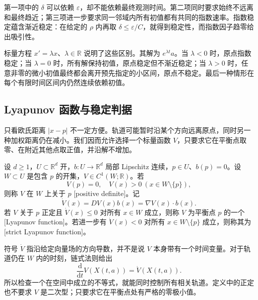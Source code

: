 第一项中的 \(\delta\) 可以依赖 \(\varepsilon\)，却不能依赖最终观测时间。第二项同时要求始终不远离和最终趋近；第三项进一步要求同一邻域内所有初值都有共同的指数速率。指数稳定蕴含渐近稳定：在给定的 \(\rho\) 内再取 \(\delta\leq\varepsilon/C\)，就得到稳定性，而指数因子趋零给出吸引性。

\ProseParagraphBreak

标量方程 \(x'=\lambda x\)、\(\lambda\in\mathbb R\) 说明了这些区别。其解为 \(e^{\lambda t}a\)。当 \(\lambda<0\) 时，原点指数稳定；当 \(\lambda=0\) 时，所有解保持初值，原点稳定但不渐近稳定；当 \(\lambda>0\) 时，任意非零的微小初值最终都会离开预先指定的小区间，原点不稳定。最后一种情形在每个有限时间区间内仍然连续依赖初值。

\subsection{Lyapunov 函数与稳定判据}
\label{b2:subsec:ode-lyapunov-stability}

只看欧氏距离 \(|x-p|\) 不一定方便。轨道可能暂时沿某个方向远离原点，同时另一种加权距离仍在减小。我们因而允许选择一个标量函数 \(V\)，只要求它在平衡点取零、在附近其他点取正值，并沿解不增加。

\begin{definition}\label{b2:def:ode-lyapunov-function}
设 \(d\geq1\)，\(U\subset\mathbb R^d\) 开，\(b:U\to\mathbb R^d\) 局部 Lipschitz 连续，\(p\in U\)、\(b(p)=0\)。设 \(W\subset U\) 是包含 \(p\) 的开集，\(V\in C^1(W;\mathbb R)\)。若
\[
 V(p)=0,\quad V(x)>0\ (x\in W\setminus\{p\}),
\]
则称 \(V\) 在 \(W\) 上关于 \(p\) [positive definite]。记
\[
 \dot V(x)=DV(x)b(x)=\nabla V(x)\cdot b(x).
\]
若 \(V\) 关于 \(p\) 正定且 \(\dot V(x)\leq0\) 对所有 \(x\in W\) 成立，则称 \(V\) 为平衡点 \(p\) 的一个[Lyapunov function]。若进一步有 \(\dot V(x)<0\) 对所有 \(x\in W\setminus\{p\}\) 成立，则称其为[strict Lyapunov function]。
\end{definition}

符号 \(\dot V\) 指沿给定向量场的方向导数，并不是说 \(V\) 本身带有一个时间变量。对于轨道仍在 \(W\) 内的时刻，链式法则给出
\[
 \frac{\mathrm d}{\mathrm dt}V(X(t,a))=\dot V(X(t,a)).
\]
所以检查一个在空间中成立的不等式，就能同时控制所有相关轨道。定义中的正定也不要求 \(V\) 是二次型；只要求它在平衡点处有严格的零极小值。

